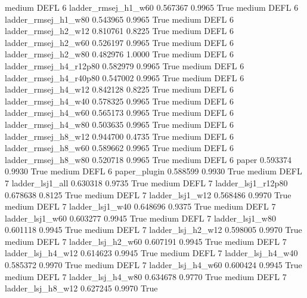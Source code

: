     medium     DEFL                 6    ladder_rmsej_h1_w60   0.567367      0.9965    True
    medium     DEFL                 6    ladder_rmsej_h1_w80   0.543965      0.9965    True
    medium     DEFL                 6    ladder_rmsej_h2_w12   0.810761      0.8225    True
    medium     DEFL                 6    ladder_rmsej_h2_w60   0.526197      0.9965    True
    medium     DEFL                 6    ladder_rmsej_h2_w80   0.482976      1.0000    True
    medium     DEFL                 6 ladder_rmsej_h4_r12p80   0.582979      0.9965    True
    medium     DEFL                 6 ladder_rmsej_h4_r40p80   0.547002      0.9965    True
    medium     DEFL                 6    ladder_rmsej_h4_w12   0.842128      0.8225    True
    medium     DEFL                 6    ladder_rmsej_h4_w40   0.578325      0.9965    True
    medium     DEFL                 6    ladder_rmsej_h4_w60   0.565173      0.9965    True
    medium     DEFL                 6    ladder_rmsej_h4_w80   0.503635      0.9965    True
    medium     DEFL                 6    ladder_rmsej_h8_w12   0.944700      0.4735    True
    medium     DEFL                 6    ladder_rmsej_h8_w60   0.589662      0.9965    True
    medium     DEFL                 6    ladder_rmsej_h8_w80   0.520718      0.9965    True
    medium     DEFL                 6                  paper   0.593374      0.9930    True
    medium     DEFL                 6           paper_plugin   0.588599      0.9930    True
    medium     DEFL                 7        ladder_lsj1_all   0.630318      0.9735    True
    medium     DEFL                 7     ladder_lsj1_r12p80   0.678638      0.8125    True
    medium     DEFL                 7        ladder_lsj1_w12   0.568486      0.9970    True
    medium     DEFL                 7        ladder_lsj1_w40   0.648696      0.9375    True
    medium     DEFL                 7        ladder_lsj1_w60   0.603277      0.9945    True
    medium     DEFL                 7        ladder_lsj1_w80   0.601118      0.9945    True
    medium     DEFL                 7      ladder_lsj_h2_w12   0.598005      0.9970    True
    medium     DEFL                 7      ladder_lsj_h2_w60   0.607191      0.9945    True
    medium     DEFL                 7      ladder_lsj_h4_w12   0.614623      0.9945    True
    medium     DEFL                 7      ladder_lsj_h4_w40   0.585372      0.9970    True
    medium     DEFL                 7      ladder_lsj_h4_w60   0.600424      0.9945    True
    medium     DEFL                 7      ladder_lsj_h4_w80   0.634678      0.9770    True
    medium     DEFL                 7      ladder_lsj_h8_w12   0.627245      0.9970    True
